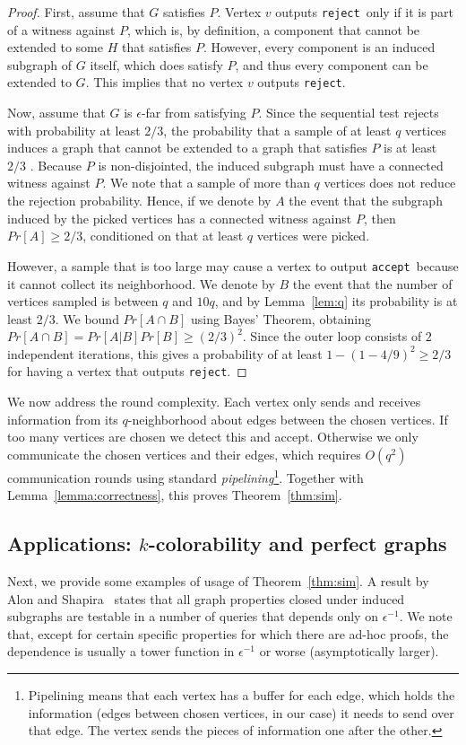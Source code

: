 \documentclass[11pt]{article}
\newcommand{\accept}{\texttt{accept}}
\newcommand{\reject}{\texttt{reject}}
\begin{document}
\begin{proof}
First, assume that $G$ satisfies $P$. Vertex $v$ outputs \reject~only if it is part of a witness against $P$, which is, by definition, a component that cannot be extended to some $H$ that satisfies $P$. However, every component is an induced subgraph of $G$ itself, which does satisfy $P$, and thus every component can be extended to $G$. This implies that no vertex $v$ outputs \reject.

Now, assume that $G$ is $\epsilon$-far from satisfying $P$. Since the sequential test rejects with probability at least $2/3$, the probability that a sample of at least $q$ vertices induces a graph that cannot be extended to a graph that satisfies $P$ is at least $2/3$ . Because $P$ is non-disjointed, the induced subgraph must have a connected witness against $P$.
We note that a sample of more than $q$ vertices does not reduce the rejection probability. Hence, if we denote by $A$ the event that the subgraph induced by the picked vertices has a connected witness against $P$, then $Pr[A] \geq 2/3$, conditioned on that at least $q$ vertices were picked.

However, a sample that is too large may cause a vertex to output \accept ~because it cannot collect its neighborhood. We denote by $B$ the event that the number of vertices sampled is between $q$ and $10q$, and by Lemma~\ref{lem:q} its probability is at least $2/3$. We bound $Pr[A\cap B]$ using Bayes' Theorem, obtaining $Pr[A\cap B]= Pr[A|B]Pr[B] \geq (2/3)^2$. Since the outer loop consists of $2$ independent iterations, this gives a  probability of at least $1-(1-4/9)^2 \geq 2/3$ for having a vertex that outputs \reject.
\end{proof}

We now address the round complexity. Each vertex only sends and receives information from its $q$-neighborhood about edges between the chosen vertices. If too many vertices are chosen we detect this and accept. Otherwise we only communicate the chosen vertices and their edges, which requires $O(q^2)$ communication rounds using standard \emph{pipelining}\footnote{Pipelining means that each vertex has a buffer for each edge, which holds the information (edges between chosen vertices, in our case) it needs to send over that edge. The vertex sends the pieces of information one after the other.}.
Together with Lemma~\ref{lemma:correctness}, this proves Theorem~\ref{thm:sim}.
	
\subsection{Applications: $k$-colorability and perfect graphs}
\label{subsec:sim}
Next, we provide some examples of usage of Theorem~\ref{thm:sim}. A result by Alon and Shapira~\cite{AlonShapira} states that all graph properties closed under induced subgraphs are testable in a number of queries that depends only on $\epsilon^{-1}$. We note that, except for certain specific properties for which there are ad-hoc proofs, the dependence is usually a tower function in $\epsilon^{-1}$ or worse (asymptotically larger).
\end{document}
